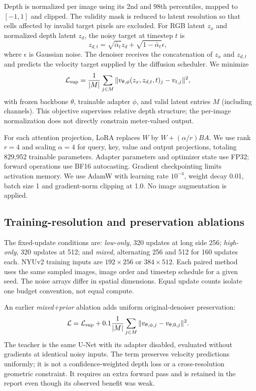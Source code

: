 Depth is normalized per image using its 2nd and 98th percentiles, mapped to $[-1,1]$ and clipped. The validity mask is reduced to latent resolution so that cells affected by invalid target pixels are excluded. For RGB latent $z_x$ and normalized depth latent $z_d$, the noisy target at timestep $t$ is
\begin{equation}
z_{d,t}=\sqrt{\bar\alpha_t}z_d+\sqrt{1-\bar\alpha_t}\epsilon,
\end{equation}
where $\epsilon$ is Gaussian noise. The denoiser receives the concatenation of $z_x$ and $z_{d,t}$ and predicts the velocity target supplied by the diffusion scheduler. We minimize
\begin{equation}
\mathcal L_{\rm sup}=\frac{1}{|M|}\sum_{j\in M}\|v_{\theta,\phi}(z_x,z_{d,t},t)_j-v_{t,j}\|^2,
\end{equation}
with frozen backbone $\theta$, trainable adapter $\phi$, and valid latent entries $M$ (including channels). This objective supervises relative depth structure; the per-image normalization does not directly constrain meter-valued output.

For each attention projection, LoRA replaces $W$ by $W+(\alpha/r)BA$. We use rank $r=4$ and scaling $\alpha=4$ for query, key, value and output projections, totaling 829,952 trainable parameters. Adapter parameters and optimizer state use FP32; forward operations use BF16 autocasting. Gradient checkpointing limits activation memory. We use AdamW with learning rate $10^{-4}$, weight decay 0.01, batch size 1 and gradient-norm clipping at 1.0. No image augmentation is applied.

\subsection{Training-resolution and preservation ablations}
The fixed-update conditions are: \textit{low-only}, 320 updates at long side 256; \textit{high-only}, 320 updates at 512; and \textit{mixed}, alternating 256 and 512 for 160 updates each. NYUv2 training inputs are $192\times256$ or $384\times512$. Each paired method uses the same sampled images, image order and timestep schedule for a given seed. The noise arrays differ in spatial dimensions. Equal update counts isolate one budget convention, not equal compute.

An earlier \textit{mixed+prior} ablation adds uniform original-denoiser preservation:
\begin{equation}
\mathcal L=\mathcal L_{\rm sup}+0.1\frac{1}{|M|}\sum_{j\in M}\|v_{\theta,\phi,j}-v_{\theta,0,j}\|^2.
\end{equation}
The teacher is the same U-Net with its adapter disabled, evaluated without gradients at identical noisy inputs. The term preserves velocity predictions uniformly; it is not a confidence-weighted depth loss or a cross-resolution geometric constraint. It requires an extra forward pass and is retained in the report even though its observed benefit was weak.

